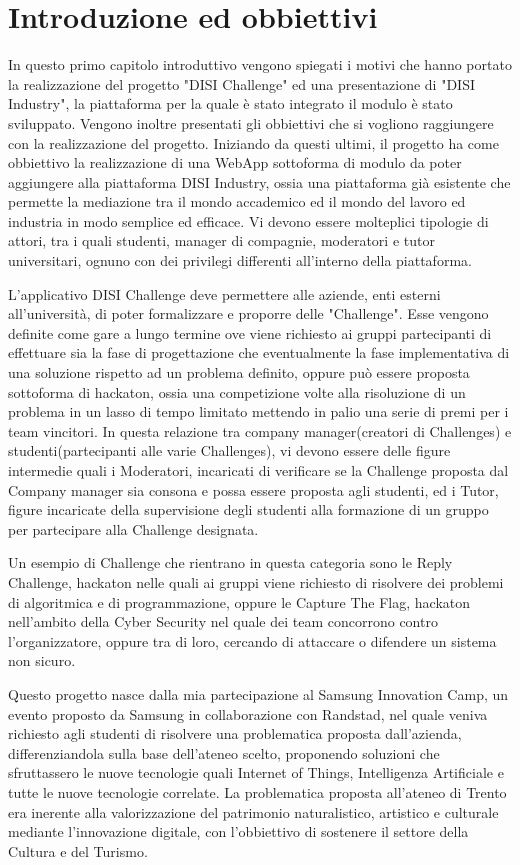\chapter{Introduzione ed obbiettivi }
\label{cha:intro}
In questo primo capitolo introduttivo vengono spiegati i motivi che hanno portato la realizzazione del progetto "DISI Challenge" ed una presentazione di "DISI Industry", la piattaforma per la quale è stato integrato il modulo è stato sviluppato. Vengono inoltre presentati gli obbiettivi che si vogliono raggiungere con la realizzazione del progetto.
Iniziando da questi ultimi, il progetto ha come obbiettivo la realizzazione di una WebApp sottoforma di modulo da poter aggiungere alla piattaforma DISI Industry, ossia una piattaforma già esistente che permette la mediazione tra il mondo accademico ed il mondo del lavoro ed industria in modo semplice ed efficace. Vi devono essere molteplici tipologie di attori, tra i quali studenti, manager di compagnie, moderatori e tutor universitari, ognuno con dei privilegi differenti all'interno della piattaforma. 


L'applicativo DISI Challenge deve permettere alle aziende, enti esterni all'università, di poter formalizzare e proporre delle "Challenge". Esse vengono definite come gare a lungo termine ove viene richiesto ai gruppi partecipanti di effettuare sia la fase di progettazione che eventualmente la fase implementativa di una soluzione rispetto ad un problema definito, oppure può essere proposta sottoforma di hackaton, ossia una competizione volte alla risoluzione di un problema in un lasso di tempo limitato mettendo in palio una serie di premi per i team vincitori. In questa relazione tra company manager(creatori di Challenges) e studenti(partecipanti alle varie Challenges), vi devono essere delle figure intermedie quali i Moderatori, incaricati di verificare se la Challenge proposta dal Company manager sia consona e possa essere proposta agli studenti, ed i Tutor, figure incaricate della supervisione degli studenti alla formazione di un gruppo per partecipare alla Challenge designata.

Un esempio di Challenge che rientrano in questa categoria sono le Reply Challenge, hackaton nelle quali ai gruppi viene richiesto di risolvere dei problemi di algoritmica e di programmazione, oppure le Capture The Flag, hackaton nell'ambito della Cyber Security nel quale dei team concorrono contro l'organizzatore, oppure tra di loro, cercando di attaccare o difendere un sistema non sicuro.

Questo progetto nasce dalla mia partecipazione al Samsung Innovation Camp, un evento proposto da Samsung in collaborazione con Randstad, nel quale veniva richiesto agli studenti di risolvere una problematica proposta dall'azienda, differenziandola sulla base dell'ateneo scelto, proponendo soluzioni che sfruttassero le nuove tecnologie quali Internet of Things, Intelligenza Artificiale e tutte le nuove tecnologie correlate. La problematica proposta all'ateneo di Trento era inerente alla valorizzazione del patrimonio naturalistico, artistico e culturale mediante l'innovazione digitale, con l'obbiettivo di sostenere il settore della Cultura e del Turismo.

